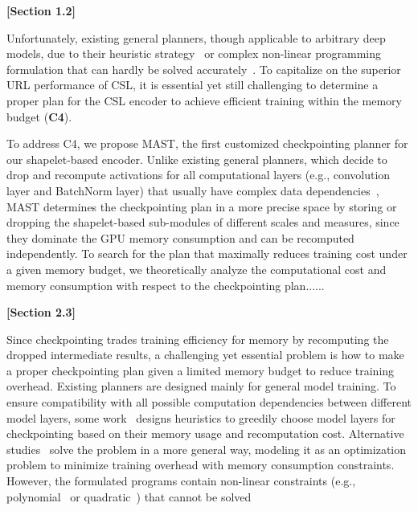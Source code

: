 \begin{sloppypar}
\begin{framed}
    \textbf{[Section 1.2]}

    Unfortunately, existing general planners, though applicable to arbitrary deep models,  due to their heuristic strategy~\cite{sublinear,DTR,mimose} or complex non-linear programming formulation that can hardly be solved accurately~\cite{jain2020checkmate,monet}. To capitalize on the superior URL performance of CSL, it is essential yet still challenging to determine a proper plan for the CSL encoder to achieve efficient training within the memory budget (\textbf{C4}).   

To address C4, we propose \textsf{MAST}, the first customized checkpointing planner for our shapelet-based encoder. Unlike existing general planners, which decide to drop and recompute activations for all computational layers (e.g., convolution layer and BatchNorm layer) that usually have complex data dependencies~\cite{jain2020checkmate}, MAST determines the checkpointing plan in a more precise space by storing or dropping the shapelet-based sub-modules of different scales and measures, since they dominate the GPU memory consumption and can be recomputed independently. To search for the  plan that maximally reduces training cost under a given memory budget, we theoretically analyze the computational cost and memory consumption with respect to the checkpointing plan......

\textbf{[Section 2.3]}

Since checkpointing trades training efficiency for memory by recomputing the dropped intermediate results, a challenging yet essential problem is how to make a proper checkpointing plan given a limited memory budget to reduce training overhead. Existing planners are designed mainly for general model training. To ensure compatibility with all possible computation dependencies between different model layers, some work~\cite{sublinear,mimose,DTR} designs heuristics to greedily choose model layers for checkpointing based on their memory usage and recomputation cost.  Alternative studies~\cite{jain2020checkmate,monet} solve the problem in a more general way, modeling it as an optimization problem to minimize training overhead with memory consumption constraints. However, the formulated programs contain non-linear constraints (e.g., polynomial~\cite{jain2020checkmate} or quadratic~\cite{monet}) that cannot be solved   


\end{framed}
\end{sloppypar}
